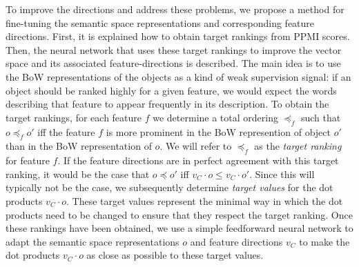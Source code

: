 To improve the directions and address these problems, we propose a method for fine-tuning the semantic space representations and corresponding feature directions. First, it is explained how to obtain target rankings from PPMI scores. Then, the neural network that uses these target rankings to improve the vector space and its associated feature-directions is described. The main  idea is to use the BoW representations of the objects as a kind of weak supervision signal: if an object should be ranked highly for a given feature, we would expect the words describing that feature to appear frequently in its description.
To obtain the target rankings, for each feature $f$ we determine a total ordering $\preccurlyeq_f$ such that $o \preccurlyeq_f o'$ iff the feature $f$ is more prominent in the BoW represention of object $o'$ than in the BoW representation of $o$. We will refer to $\preccurlyeq_f$ as the \emph{target ranking} for feature $f$. If the feature directions are in perfect agreement with this target ranking, it would be the case that $o \preccurlyeq o'$ iff  $v_C \cdot o \leq v_C \cdot o'$. Since this will typically not be the case, we subsequently determine \emph{target values} for the dot products $v_C \cdot o$. These target values represent the minimal way in which the dot products need to be changed to ensure that they respect the target ranking.
Once these rankings have been obtained, we use a simple feedforward neural network to adapt the semantic space representations $o$ and feature directions $v_C$ to make the dot products $v_C \cdot o$ as close as possible to these target values. 


